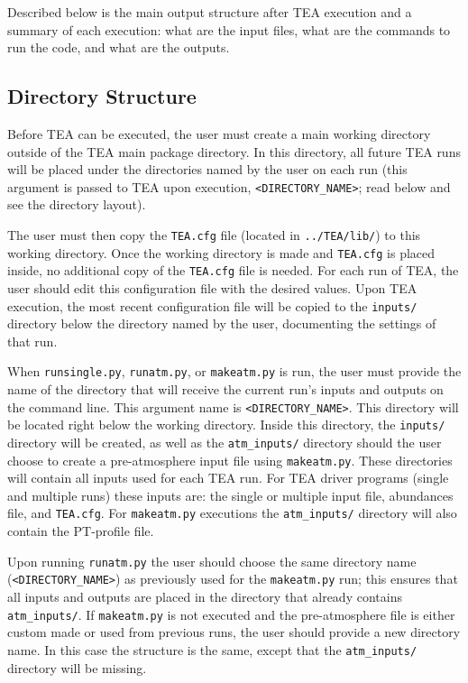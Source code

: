 {Described below is the main output structure after TEA execution and a
summary of each execution: what are the input files, what are the
commands to run the code, and what are the outputs.

\subsection{Directory Structure}
\label{dir-struc}

Before TEA can be executed, the user must create a main working
directory outside of the TEA main package directory. In this
directory, all future TEA runs will be placed under the directories
named by the user on each run (this argument is passed to TEA upon
execution, \newline \texttt{<DIRECTORY\_NAME>}; read below and see the
directory layout).

The user must then copy the \texttt{TEA.cfg} file (located in
\texttt{../TEA/lib/}) to this working directory. Once the working
directory is made and \texttt{TEA.cfg} is placed inside, no additional
copy of the \texttt{TEA.cfg} file is needed. For each run of TEA, the
user should edit this configuration file with the desired values. Upon
TEA execution, the most recent configuration file will be copied to
the
\texttt{inputs/} directory below the directory named by the user,
documenting the settings of that run.

When \texttt{runsingle.py}, \texttt{runatm.py}, or \texttt{makeatm.py}
is run, the user must provide the name of the directory that will
receive the current run's inputs and outputs on the command line. This
argument name is
\texttt{<DIRECTORY\_NAME\math>}. This directory will be located
right below the working directory. Inside this directory, the
\texttt{inputs/} directory will be created, as well as the
\texttt{atm\_inputs/} directory should the user choose to create a
pre-atmosphere input file using \texttt{makeatm.py}.  These
directories will contain all inputs used for each TEA run. For TEA
driver programs (single and multiple  runs) these inputs
are: the single or multiple  input file, abundances file,
and \texttt{TEA.cfg}. For \texttt{makeatm.py} executions the
\texttt{atm\_inputs/} directory will also contain the PT-profile file.



Upon running \texttt{runatm.py} the user should choose the same
directory name \newline (\texttt{<DIRECTORY\_NAME>}) as previously
used for the \texttt{makeatm.py} run; this ensures that all inputs and
outputs are placed in the directory that already contains
\texttt{atm\_inputs/}. If \texttt{makeatm.py} is not
executed and the pre-atmosphere file is either custom made or used
from previous runs, the user should provide a new directory name. In
this case the structure is the same, except that the
\texttt{atm\_inputs/} directory will be missing.

}
